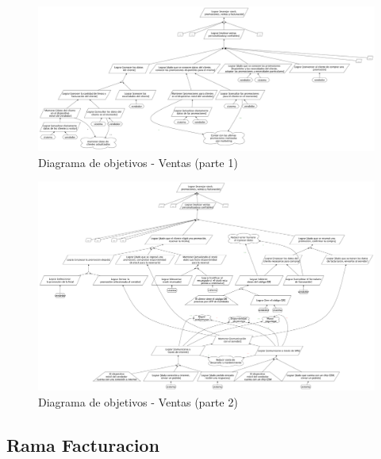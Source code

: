 \begin{figure}[h!]
  \centering
  \includegraphics[width=1.5\textwidth, angle=90]{./imagenes/ventas_1.pdf}
  \caption{Diagrama de objetivos - Ventas (parte 1)}
\end{figure}


\clearpage

\clearpage

\begin{figure}[h!]
  \centering
  \includegraphics[width=1.5\textwidth, angle=90]{./imagenes/ventas_2.pdf}
  \caption{Diagrama de objetivos - Ventas (parte 2)}
\end{figure}

\clearpage

\subsection{Rama Facturacion}

